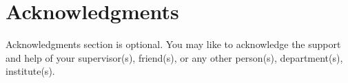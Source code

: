 \chapter*{\center \Large  Acknowledgments}

Acknowledgments section is optional. You may like to acknowledge the support and help of your supervisor(s), friend(s), or any other person(s), department(s), institute(s).

